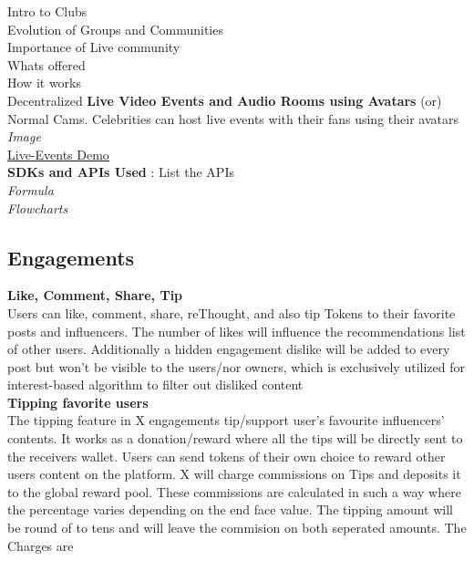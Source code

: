 \documentclass[letterpaper,11pt]{article}
\begin{document}
Intro to Clubs\\

Evolution of Groups and Communities\\

Importance of Live community\\

Whats offered\\

How it works\\


Decentralized \textbf{Live Video Events and Audio Rooms using Avatars} (or) Normal Cams. Celebrities can host live events with their fans using their avatars\\

\textit{Image}\\
\hyperlink{https://sample.com}{Live-Events Demo}\\

\textbf{SDKs and APIs Used} : List the APIs\\

\textit{Formula\\
Flowcharts}

\subsection{\textbf{Engagements}}

\textbf{Like, Comment, Share, Tip}\\

Users can like, comment, share, reThought, and also tip Tokens to their favorite posts and influencers. The number of likes will influence the recommendations list of other users. Additionally a hidden engagement dislike will be added to every post but won't be visible to the users/nor owners, which is exclusively utilized for interest-based algorithm to filter out disliked content\\

\textbf{Tipping favorite users}\\

The tipping feature in X engagements tip/support user's favourite influencers' contents. It works as a donation/reward where all the tips will be directly sent to the receivers wallet. Users can send tokens of their own choice to reward other users content on the platform. X will charge commissions on Tips and deposits it to the global reward pool. These commissions are calculated in such a way where the percentage varies depending on the end face value. The tipping amount will be round of to tens and will leave the commision on both seperated amounts. The Charges are\\
\end{document}
